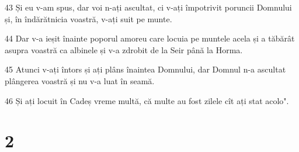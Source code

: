 \par 43 Și eu v-am spus, dar voi n-ați ascultat, ci v-ați împotrivit poruncii Domnului și, în îndărătnicia voastră, v-ați suit pe munte.
\par 44 Dar v-a ieșit înainte poporul amoreu care locuia pe muntele acela și a tăbărât asupra voastră ca albinele și v-a zdrobit de la Seir până la Horma.
\par 45 Atunci v-ați întors și ați plâns înaintea Domnului, dar Domnul n-a ascultat plângerea voastră și nu v-a luat în seamă.
\par 46 Și ați locuit în Cadeș vreme multă, că multe au fost zilele cît ați stat acolo".

\chapter{2}

